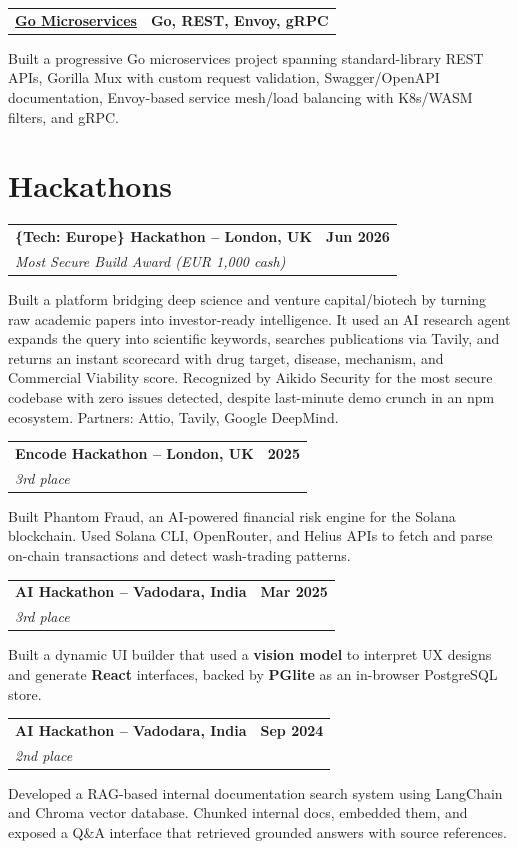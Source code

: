 \documentclass[letterpaper,10pt]{article}
\makeatletter
\newcommand{\resumeProject}[3]{%
  \noindent\begin{tabular*}{\textwidth}{@{}l@{\extracolsep{\fill}}r@{}}
    \textbf{\href{#2}{#1}} & \textbf{\small #3}
  \end{tabular*}\vspace{-2pt}
}
\newcommand{\resumeHackathon}[3]{%
  \noindent\begin{tabular*}{\textwidth}{@{}l@{\extracolsep{\fill}}r@{}}
    \textbf{#1} & \textbf{#2}\\[-1pt]
    \textit{#3} &
  \end{tabular*}\vspace{-2pt}
}
\makeatother
\begin{document}
\resumeProject{Go Microservices}{https://github.com/aymanapatel/golang-microservices}{Go, REST, Envoy, gRPC}
Built a progressive Go microservices project spanning standard-library REST APIs, Gorilla Mux with custom request validation, Swagger/OpenAPI documentation, Envoy-based service mesh/load balancing with K8s/WASM filters, and gRPC.\par\vspace{2pt}


\section{Hackathons}
\resumeHackathon{\{Tech: Europe\} Hackathon -- London, UK}{Jun 2026}{Most Secure Build Award (EUR 1,000 cash)}
Built a platform bridging deep science and venture capital/biotech by turning raw academic papers into investor-ready intelligence. It used an AI research agent expands the query into scientific keywords, searches publications via Tavily, and returns an instant scorecard with drug target, disease, mechanism, and Commercial Viability score. Recognized by Aikido Security for the most secure codebase with zero issues detected, despite last-minute demo crunch in an npm ecosystem. Partners: Attio, Tavily, Google DeepMind.\par\vspace{2pt}

\resumeHackathon{Encode Hackathon -- London, UK}{2025}{3rd place}
Built Phantom Fraud, an AI-powered financial risk engine for the Solana blockchain. Used Solana CLI, OpenRouter, and Helius APIs to fetch and parse on-chain transactions and detect wash-trading patterns.\par\vspace{2pt}

\resumeHackathon{AI Hackathon -- Vadodara, India}{Mar 2025}{3rd place}
Built a dynamic UI builder that used a \textbf{vision model} to interpret UX designs and generate \textbf{React} interfaces, backed by \textbf{PGlite} as an in-browser PostgreSQL store.\par\vspace{2pt}
\resumeHackathon{AI Hackathon -- Vadodara, India}{Sep 2024}{2nd place}
Developed a RAG-based internal documentation search system using LangChain and Chroma vector database. Chunked internal docs, embedded them, and exposed a Q\&A interface that retrieved grounded answers with source references.\par\vspace{2pt}
\end{document}
